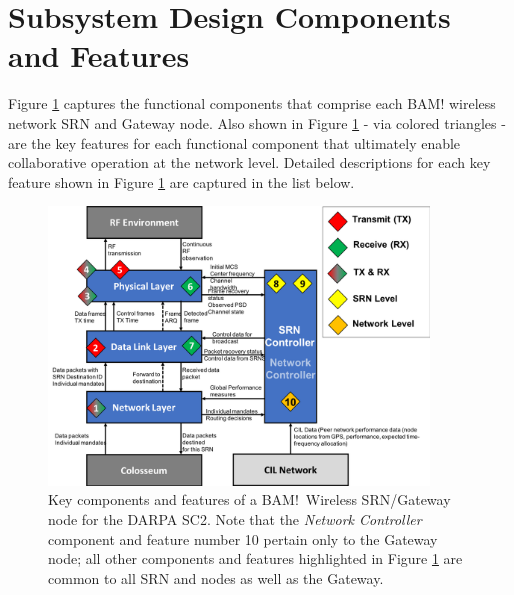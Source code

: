 \documentclass[11pt]{article}
\begin{document}
 \section{Subsystem Design Components and Features}
 Figure \ref{fg:BAM-SC2-arch} captures the functional components that comprise each BAM! wireless network SRN and Gateway node.  Also shown in Figure \ref{fg:BAM-SC2-arch} - via colored triangles - are the key features for each functional component that ultimately enable collaborative operation at the network level.  Detailed descriptions for each key feature shown in Figure \ref{fg:BAM-SC2-arch} are captured in the list below.
 \begin{figure} [htb]
 \centerline{
 \includegraphics[width = 0.9\textwidth]{Figures/SysFuncBD.png}}
 \caption{Key components and features of a BAM!\ Wireless SRN/Gateway node for the DARPA SC2.   Note that the \emph{Network Controller} component and feature number 10 pertain only to the Gateway node; all other components and features highlighted in Figure \ref{fg:BAM-SC2-arch} are common to all SRN and nodes as well as the Gateway.}
 \label{fg:BAM-SC2-arch}
 \end{figure} 
 
\end{document}
